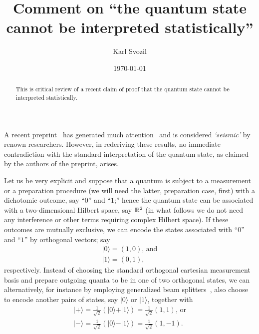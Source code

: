 \documentclass[%
 preprint,
 showpacs,
 showkeys,
 preprintnumbers,
 amsmath,amssymb,
 aps,
 pra,
  longbibliography,
 ]{revtex4-1}
\begin{document}
\title{Comment on ``the quantum state cannot be interpreted statistically''}


\author{Karl Svozil}
 


\date{\today}

\begin{abstract}
This is critical review of a recent claim of proof that the quantum state cannot be interpreted statistically.
\end{abstract}

\maketitle

A recent preprint~\cite{Pusey-arXiv:1111.3328} has generated much attention~\cite{Reich-11}
and is considered {\em `seismic'} by renown researchers.
However, in rederiving these results, no immediate contradiction
with the standard interpretation of the
quantum state, as claimed by the authors of the preprint, arises.

Let us be very explicit and suppose that a quantum is subject to a measurement or a preparation
procedure
(we will need the latter, preparation case, first) with
a dichotomic outcome, say ``$0$'' and ``$1$;''
hence the quantum state can be associated with a two-dimensional Hilbert space, say ${\Bbb R}^2$
(in what follows we do not need any interference or other terms requiring complex Hilbert space).
If these outcomes are mutually exclusive,
we can encode the states associated with ``$0$'' and ``$1$'' by  orthogonal vectors; say
\begin{equation}
\begin{array}{l}
\vert 0 \rangle = (1,0) \textrm{, and}     \\
\vert 1 \rangle = (0,1),
\end{array}
\end{equation}
respectively.
Instead of choosing the standard orthogonal cartesian measurement basis
and prepare outgoing quanta to be in one of two orthogonal states,
we can alternatively, for instance by
employing generalized beam splitters~\cite{rzbb}, also choose to encode another
pairs of states, say  $\vert 0 \rangle$ or $\vert 1 \rangle$, together with
\begin{equation}
\begin{array}{l}
\vert + \rangle =\frac{1}{\sqrt{2} }
\left( \vert 0 \rangle + \vert 1 \rangle \right) = \frac{1}{\sqrt{2}} (1,1)
\textrm{, or}  \\
\vert - \rangle =\frac{1}{\sqrt{2} }
\left( \vert 0 \rangle - \vert 1 \rangle \right) = \frac{1}{\sqrt{2}} (1,-1).
\end{array}
\end{equation}
\end{document}
